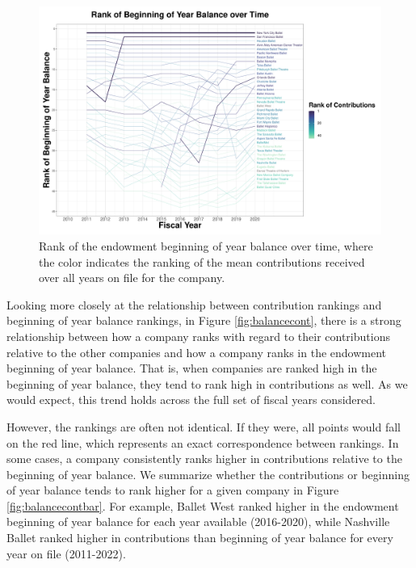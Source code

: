 \documentclass[Dance Data
Project,article,submit,moreauthors,pdftex]{mdpi}
\begin{document}
\begin{figure}[H]
\includegraphics[width=0.9\linewidth,]{../images/rank-endowments-color-contribution} \caption{\label{fig:rank-endowments-color-contribution}Rank of the endowment beginning of year balance over time, where the color indicates the ranking of the mean contributions received over all years on file for the company.}\label{fig:unnamed-chunk-2}
\end{figure}

Looking more closely at the relationship between contribution rankings
and beginning of year balance rankings, in Figure \ref{fig:balancecont},
there is a strong relationship between how a company ranks with regard
to their contributions relative to the other companies and how a company
ranks in the endowment beginning of year balance. That is, when
companies are ranked high in the beginning of year balance, they tend to
rank high in contributions as well. As we would expect, this trend holds
across the full set of fiscal years considered.

However, the rankings are often not identical. If they were, all points
would fall on the red line, which represents an exact correspondence
between rankings. In some cases, a company consistently ranks higher in
contributions relative to the beginning of year balance. We summarize
whether the contributions or beginning of year balance tends to rank
higher for a given company in Figure \ref{fig:balancecontbar}. For
example, Ballet West ranked higher in the endowment beginning of year
balance for each year available (2016-2020), while Nashville Ballet
ranked higher in contributions than beginning of year balance for every
year on file (2011-2022).
\end{document}
